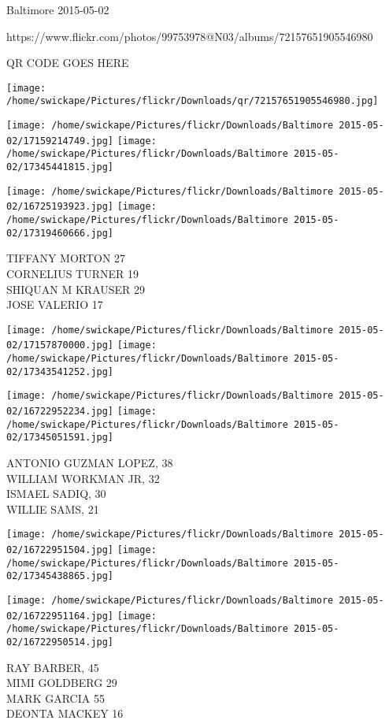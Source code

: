 \documentclass[10pt,letterpaper]{article}
\begin{document}
Baltimore 2015-05-02

https://www.flickr.com/photos/99753978@N03/albums/72157651905546980

QR CODE GOES HERE

\texttt{[image: /home/swickape/Pictures/flickr/Downloads/qr/72157651905546980.jpg]}
\pagebreak

\texttt{[image: /home/swickape/Pictures/flickr/Downloads/Baltimore 2015-05-02/17159214749.jpg]}
\texttt{[image: /home/swickape/Pictures/flickr/Downloads/Baltimore 2015-05-02/17345441815.jpg]}

\texttt{[image: /home/swickape/Pictures/flickr/Downloads/Baltimore 2015-05-02/16725193923.jpg]}
\texttt{[image: /home/swickape/Pictures/flickr/Downloads/Baltimore 2015-05-02/17319460666.jpg]}

TIFFANY MORTON 27\\
CORNELIUS TURNER 19\\
SHIQUAN M KRAUSER 29\\
JOSE VALERIO 17\\
\pagebreak

\texttt{[image: /home/swickape/Pictures/flickr/Downloads/Baltimore 2015-05-02/17157870000.jpg]}
\texttt{[image: /home/swickape/Pictures/flickr/Downloads/Baltimore 2015-05-02/17343541252.jpg]}

\texttt{[image: /home/swickape/Pictures/flickr/Downloads/Baltimore 2015-05-02/16722952234.jpg]}
\texttt{[image: /home/swickape/Pictures/flickr/Downloads/Baltimore 2015-05-02/17345051591.jpg]}

ANTONIO GUZMAN LOPEZ, 38\\
WILLIAM WORKMAN JR, 32\\
ISMAEL SADIQ, 30\\
WILLIE SAMS, 21\\
\pagebreak

\texttt{[image: /home/swickape/Pictures/flickr/Downloads/Baltimore 2015-05-02/16722951504.jpg]}
\texttt{[image: /home/swickape/Pictures/flickr/Downloads/Baltimore 2015-05-02/17345438865.jpg]}

\texttt{[image: /home/swickape/Pictures/flickr/Downloads/Baltimore 2015-05-02/16722951164.jpg]}
\texttt{[image: /home/swickape/Pictures/flickr/Downloads/Baltimore 2015-05-02/16722950514.jpg]}

RAY BARBER, 45\\
MIMI GOLDBERG 29\\
MARK GARCIA 55\\
DEONTA MACKEY 16\\
\pagebreak
\end{document}
